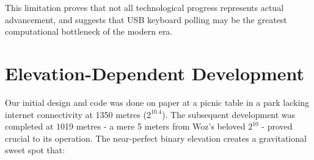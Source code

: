 \documentclass[10pt,twocolumn]{article}
\begin{document}

This limitation proves that not all technological progress represents actual advancement, and suggests that USB keyboard polling may be the greatest computational bottleneck of the modern era.






\section{Elevation-Dependent Development}

Our initial design and code was done on paper at a picnic table in a park lacking internet connectivity at 1350 metres ($2^{10.4}$).  The subsequent development was completed at 1019 metres - a mere 5 meters from Woz's beloved $2^{10}$ - proved crucial to its operation. The near-perfect binary elevation creates a gravitational sweet spot that:
\end{document}
